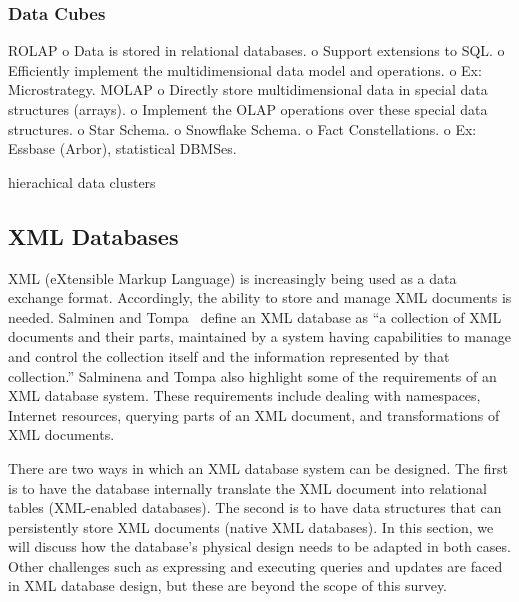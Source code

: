 \documentclass[12pt,a4paper]{article}
\begin{document}
\subsubsection{Data Cubes}
\cite{Cheung20011}
ROLAP
          o Data is stored in relational databases.
          o Support extensions to SQL.
          o Efficiently implement the multidimensional data model and operations.
          o Ex: Microstrategy.
MOLAP
          o Directly store multidimensional data in special data structures (arrays).
          o Implement the OLAP operations over these special data structures.
          o Star Schema.
          o Snowflake Schema. \cite{kimball2009data}
          o Fact Constellations.
          o Ex: Essbase (Arbor), statistical DBMSes.

hierachical data clusters \cite{karayannidis2008hierarchical}

\subsection{XML Databases}
\label{SEC-XML}

XML (eXtensible Markup Language) is increasingly being used as a data exchange format. Accordingly, the ability to store and manage XML documents is needed. Salminen and Tompa~\cite{salminen2001requirements} define an XML database as ``a collection of XML documents
and their parts, maintained by a system having capabilities to
manage and control the collection itself and the information
represented by that collection.'' Salminena and Tompa also highlight some of the requirements of an XML database system. These requirements include dealing with namespaces, Internet resources, querying parts of an XML document, and transformations of XML documents.

There are two ways in which an XML database system can be designed. The first is to have the database internally translate the XML document into relational tables (XML-enabled databases). The second is to have data structures that can persistently store XML documents (native XML databases). In this section, we will discuss how the database's physical design needs to be adapted in both cases. Other challenges such as expressing and executing queries and updates are faced in XML database design, but these are beyond the scope of this survey.

\end{document}
